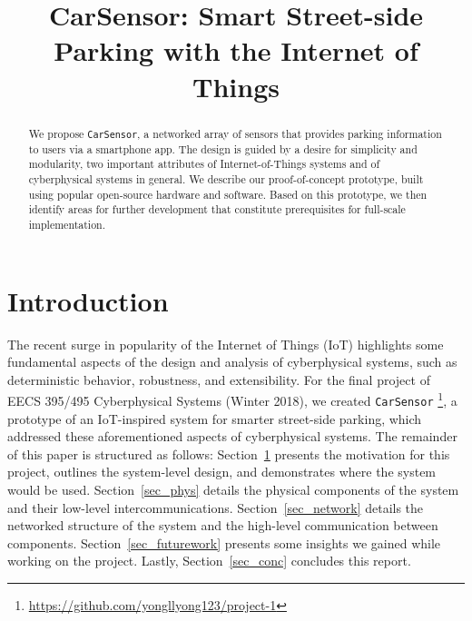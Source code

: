 \documentclass[conference]{IEEEtran}
\begin{document}


\title{CarSensor: Smart Street-side Parking with the Internet of Things}

\author{
	\and
	}
	
\maketitle

\begin{abstract}
We propose \texttt{CarSensor}, a networked array of sensors that provides parking information to users via a smartphone app. The design is guided by a desire for simplicity and modularity, two important attributes of Internet-of-Things systems and of cyberphysical systems in general. We describe our proof-of-concept prototype, built using popular open-source hardware and software. Based on this prototype, we then identify areas for further development that constitute prerequisites for full-scale implementation.
\end{abstract}

\section{Introduction}\label{sec_intro}
The recent surge in popularity of the Internet of Things (IoT) highlights some fundamental aspects of the design and analysis of cyberphysical systems, such as deterministic behavior, robustness, and extensibility. For the final project of EECS 395/495 Cyberphysical Systems (Winter 2018), we created \texttt{CarSensor} \footnote{\url{https://github.com/yongllyong123/project-1}}, a prototype of an IoT-inspired system for smarter street-side parking, which addressed these aforementioned aspects of cyberphysical systems. The remainder of this paper is structured as follows: Section~\ref{sec_intro} presents the motivation for this project, outlines the system-level design, and demonstrates where the system would be used. Section~\ref{sec_phys} details the physical components of the system and their low-level intercommunications. Section~\ref{sec_network} details the networked structure of the system and the high-level communication between components. Section~\ref{sec_futurework} presents some insights we gained while working on the project. Lastly, Section~\ref{sec_conc} concludes this report.
\end{document}
